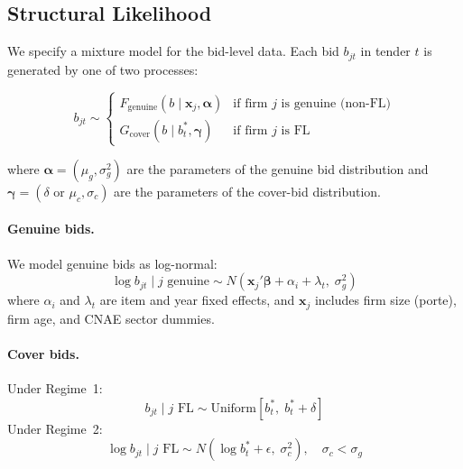 
\subsection{Structural Likelihood}
\label{sec:likelihood}

We specify a mixture model for the bid-level data. Each bid $b_{jt}$ in
tender $t$ is generated by one of two processes:

\begin{equation}
  b_{jt} \sim
  \begin{cases}
    F_{\text{genuine}}(b \mid \mathbf{x}_j, \boldsymbol{\alpha}) &
      \text{if firm } j \text{ is genuine (non-FL)} \\
    G_{\text{cover}}(b \mid b^*_t, \boldsymbol{\gamma}) &
      \text{if firm } j \text{ is FL}
  \end{cases}
  \label{eq:mixture}
\end{equation}

\noindent where $\boldsymbol{\alpha} = (\mu_g, \sigma_g^2)$ are the
parameters of the genuine bid distribution and $\boldsymbol{\gamma} =
(\delta \text{ or } \mu_c, \sigma_c)$ are the parameters of the
cover-bid distribution.

\paragraph{Genuine bids.} We model genuine bids as log-normal:
\begin{equation}
  \log b_{jt} \mid j \text{ genuine} \sim
  N\!\left(\mathbf{x}_j'\boldsymbol{\beta} + \alpha_i + \lambda_t,
  \; \sigma_g^2\right)
  \label{eq:genuine_dist}
\end{equation}
where $\alpha_i$ and $\lambda_t$ are item and year fixed effects, and
$\mathbf{x}_j$ includes firm size (porte), firm age, and CNAE sector
dummies.

\paragraph{Cover bids.} Under Regime~1:
\begin{equation}
  b_{jt} \mid j \text{ FL} \sim
  \text{Uniform}[b^*_t, \; b^*_t + \delta]
  \label{eq:cover_dist_r1}
\end{equation}
Under Regime~2:
\begin{equation}
  \log b_{jt} \mid j \text{ FL} \sim
  N\!\left(\log b^*_t + \epsilon, \; \sigma_c^2\right),
  \quad \sigma_c < \sigma_g
  \label{eq:cover_dist_r2}
\end{equation}

